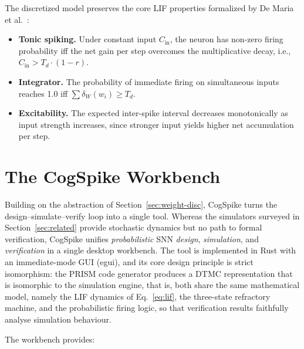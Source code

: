 \documentclass[runningheads]{llncs}
\begin{document}
The discretized model preserves the core LIF properties formalized by De Maria et
al.~\cite{naco20}:

\begin{itemize}
\item \textbf{Tonic spiking.} Under constant input $C_{\mathrm{in}}$, the neuron
  has non-zero firing probability iff the net gain per step overcomes the
  multiplicative decay, i.e., $C_{\mathrm{in}} > T_d \cdot (1 - r)$.
\item \textbf{Integrator.} The probability of immediate firing on simultaneous
  inputs reaches 1.0 iff $\sum \delta_W(w_i) \geq T_d$.
\item \textbf{Excitability.} The expected inter-spike interval decreases
  monotonically as input strength increases, since stronger input yields higher
  net accumulation per step.
\end{itemize}


\section{The CogSpike Workbench}\label{sec:cogspike}

Building on the abstraction of Section~\ref{sec:weight-disc}, CogSpike turns the
design--simulate--verify loop into a single tool. Whereas the simulators surveyed
in Section~\ref{sec:related} provide stochastic dynamics but no path to formal
verification, CogSpike unifies \emph{probabilistic} SNN \emph{design},
\emph{simulation}, and \emph{verification} in a single desktop workbench. The
tool is implemented in Rust with an immediate-mode GUI (egui), and its core
design principle is strict isomorphism: the PRISM code generator produces a DTMC
representation that is isomorphic to the simulation engine, that is, both share
the same mathematical model, namely the LIF dynamics of Eq.~\ref{eq:lif}, the
three-state refractory machine, and the probabilistic firing logic, so that
verification results faithfully analyse simulation behaviour.

The workbench provides:
\end{document}
